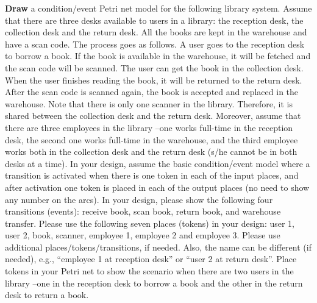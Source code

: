 \documentclass[11pt,letterpaper]{article}
\begin{document}
{\bf Draw} a  condition/event Petri  net  model  for  the  following  library  system. Assume  that there  are three  desks  available  to  users  in  a  library: the  reception  desk,  the  collection  desk  and  the  return  desk.  All the  books  are kept in the warehouse and have a scan code.  The process goes as follows. A user goes to the reception desk to borrow a book. If the book is available in the warehouse, it will be fetched and the scan code will be scanned. The user can get the book in the collection desk. When the user finishes reading the book, it will be returned to the return desk. After the scan code  is  scanned  again,  the  book  is  accepted  and  replaced  in  the  warehouse. Note  that  there  is  only  one  scanner  in  the library. Therefore,  it  is  shared  between  the  collection  desk  and  the  return  desk.  Moreover,  assume  that  there  are  three employees in the library –one works full-time in the reception desk, the second one works full-time in the warehouse, and the third employee works both in the collection desk and the return desk (s/he cannot be in both desks at a time). In your design, assume the basic condition/event model where a transition is activated when there is one token in each of the input places, and after activation one token is placed in each of the output places (no need to show any number on the arcs). In your  design,  please  show  the  following  four  transitions  (events):  receive  book,  scan  book,  return  book,  and  warehouse transfer.  Please  use  the  following seven places  (tokens)  in  your  design:  user  1,  user  2, book, scanner,  employee  1, employee 2 and employee 3. Please use additional places/tokens/transitions, if needed. Also, the name can be different (if needed), e.g., “employee 1 at reception desk” or “user 2 at return desk”. Place tokens  in  your  Petri  net  to  show  the scenario when there are two users in the library –one in the reception desk to borrow a book and the other in the return desk to return a book.

\pagebreak
\end{document}
